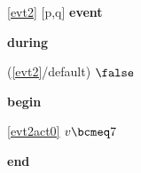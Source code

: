 \noindent \ref{evt2} [p,q] \textbf{event}
\begin{block}
  \item   \textbf{during}
  \begin{block}
  \item[ (\ref{evt2}/default) ]{$\false $} %
  \end{block}
  \item   \textbf{begin}
  \begin{block}
  \item[ \eqref{evt2act0} ]{$v \bcmeq 7$} %
  \end{block}
  \item   \textbf{end} \\
\end{block}
